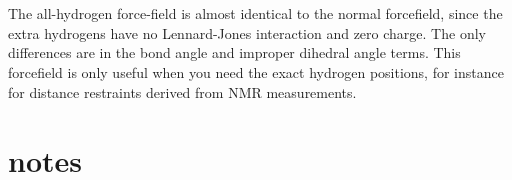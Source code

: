 %
%
%


\section{}
The {\gromacs} all-hydrogen force-field is almost identical to the normal
{\gromacs} forcefield, since the extra hydrogens have no Lennard-Jones
interaction and zero charge. The only differences are in the bond angle
and improper dihedral angle terms. This forcefield is only useful when
you need the exact hydrogen positions, for instance for distance
restraints derived from NMR measurements.

\section{ notes}

